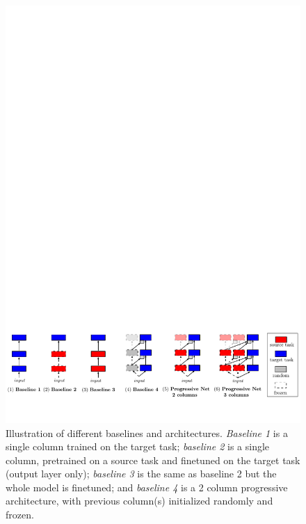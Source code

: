\begin{figure}[h]
  \centering
    \includegraphics[width=.85\textwidth]{figures/baselineDepiction6}
    \caption{Illustration of different baselines and
      architectures. \emph{Baseline 1} is a single column trained on the target task;
\emph{baseline 2} is a single column, pretrained on a source task and
finetuned on the target task (output layer only); \emph{baseline 3} is
the same as baseline 2 but the whole model is finetuned; and
\emph{baseline 4} is a 2 column progressive architecture,
        with previous column(s) initialized randomly and frozen.
    }
    \label{fig:baselines}
\end{figure}

